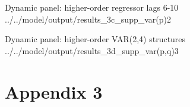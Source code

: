\wraptable
    {Dynamic panel: higher-order regressor lags 6-10}
    {../../model/output/results_3c_supp_var(p)2}
    {}
    
\wraptable
    {Dynamic panel: higher-order VAR(2,4) structures}
    {../../model/output/results_3d_supp_var(p,q)3}
    {} 

\newpage

\newpage

\section*{Appendix 3}

